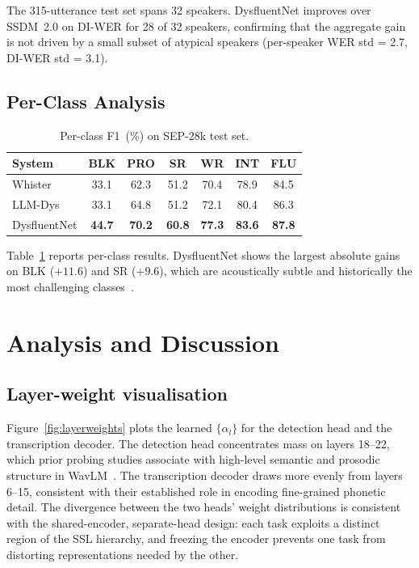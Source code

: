 \documentclass[cameraready]{Interspeech}
\begin{document}
The 315-utterance test set spans 32 speakers. DysfluentNet improves over
SSDM~2.0 on DI-WER for 28 of 32 speakers, confirming that the aggregate
gain is not driven by a small subset of atypical speakers
(per-speaker WER std = 2.7, DI-WER std = 3.1).

\subsection{Per-Class Analysis}

\begin{table}[t]
    \centering
    \caption{Per-class F1~(\%) on SEP-28k test set.}
    \label{tab:perclass}
    \renewcommand{\arraystretch}{1.1}
    \setlength{\tabcolsep}{4.5pt}
    \begin{tabular}{lcccccc}
        \toprule
        \textbf{System}
            & \textbf{BLK} & \textbf{PRO} & \textbf{SR}
            & \textbf{WR}  & \textbf{INT} & \textbf{FLU} \\
        \midrule
        Whister~\cite{changawala2024whister}
            & 33.1 & 62.3 & 51.2 & 70.4 & 78.9 & 84.5 \\
        LLM-Dys~\cite{wagner2024llm}
            & 33.1 & 64.8 & 51.2 & 72.1 & 80.4 & 86.3 \\
        DysfluentNet
            & \textbf{44.7} & \textbf{70.2} & \textbf{60.8}
            & \textbf{77.3} & \textbf{83.6} & \textbf{87.8} \\
        \bottomrule
    \end{tabular}
\end{table}

Table~\ref{tab:perclass} reports per-class results. DysfluentNet shows the
largest absolute gains on BLK ($+11.6$) and SR ($+9.6$), which are
acoustically subtle and historically the most challenging
classes~\cite{sheikh2023advancing}.

\section{Analysis and Discussion}
\label{sec:analysis}

\subsection{Layer-weight visualisation}

Figure~\ref{fig:layerweights} plots the learned $\{\alpha_l\}$ for the
detection head and the transcription decoder. The detection head concentrates
mass on layers 18--22, which prior probing studies associate with high-level
semantic and prosodic structure in WavLM~\cite{changawala2024whister}. The
transcription decoder draws more evenly from layers 6--15, consistent with
their established role in encoding fine-grained phonetic detail. The divergence
between the two heads' weight distributions is consistent with the
shared-encoder, separate-head design: each task exploits a distinct region
of the SSL hierarchy, and freezing the encoder prevents one task from
distorting representations needed by the other.
\end{document}
